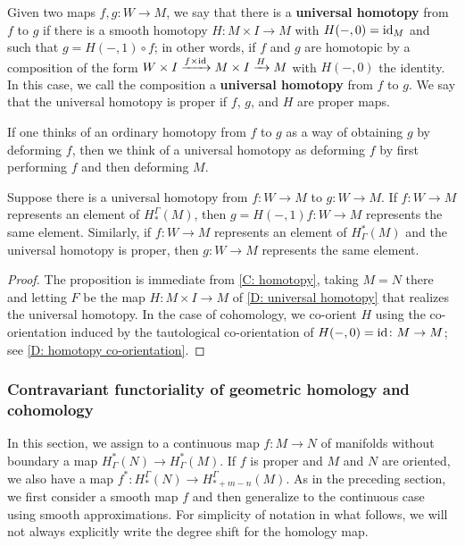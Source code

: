 \begin{definition}\label{D: universal homotopy}
	Given two maps $f,g \colon W\to M$, we say that there is a \textbf{universal homotopy} from $f$ to $g$ if there is a smooth homotopy $H \colon M\times I\to M$ with $H(-,0)=\mathrm{id}_M$ and such that $g=H(-,1)\circ f$; in other words, if $f$ and $g$ are homotopic by a composition of the form $W \times I \xrightarrow{f\times \mathrm{id}} M \times I \xrightarrow{H} M$ with $H(-,0)$ the identity. In this case, we call the composition a \textbf{universal homotopy} from $f$ to $g$. We say that the universal homotopy is proper if $f$, $g$, and $H$ are proper maps.
\end{definition}

If one thinks of an ordinary homotopy from $f$ to $g$ as a way of obtaining $g$ by deforming $f$, then we think of a universal homotopy as deforming $f$ by first performing $f$ and then deforming $M$.


\begin{proposition}\label{P: universal homotopy}
	Suppose there is a universal homotopy from $f \colon W\to M$ to $g \colon W\to M$. If $f \colon W\to M$ represents an element of $H_*^\Gamma(M)$, then $g = H(-,1)f \colon W\to M$ represents the same element. Similarly, if $f \colon W\to M$ represents an element of $H^*_\Gamma(M)$ and the universal homotopy is proper, then $g \colon W\to M$ represents the same element.
\end{proposition}

\begin{proof}
	The proposition is immediate from \cref{C: homotopy}, taking $M=N$ there and letting $F$ be the map $H \colon M \times I \to M$ of \cref {D: universal homotopy} that realizes the universal homotopy. In the case of cohomology, we co-orient $H$ using the co-orientation induced by the tautological co-orientation of $H(-,0) = \mathrm{id} \colon M \to M$; see \cref{D: homotopy co-orientation}.
\end{proof}

\subsubsection{Contravariant functoriality of geometric homology and cohomology}\label{S: cohomology pullback}

In this section, we assign to a continuous map $f \colon M \to N$ of manifolds without boundary a map $H^*_\Gamma(N) \to H^*_\Gamma(M)$.
If $f$ is proper and $M$ and $N$ are oriented, we also have a map $f^* \colon H_*^\Gamma(N) \to H_{*+m-n}^\Gamma(M)$.
As in the preceding section, we first consider a smooth map $f$ and then generalize to the continuous case using smooth approximations.
For simplicity of notation in what follows, we will not always explicitly write the degree shift for the homology map.

